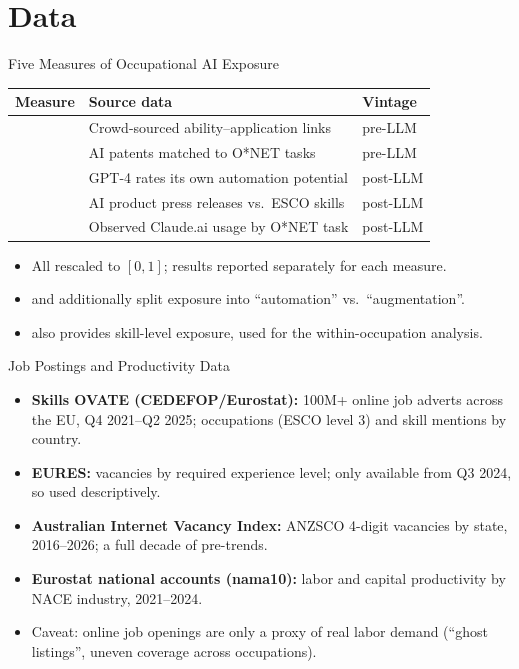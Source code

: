 \documentclass{beamer}
\begin{document}
\section{Data}
\begin{frame}{Five Measures of Occupational AI Exposure}
\footnotesize
\begin{table}
\begin{tabular}{lll}
\toprule
Measure & Source data & Vintage \\
\midrule
\citet{felten_method_2018} & Crowd-sourced ability--application links & pre-LLM \\
\citet{webb_impact_2022} & AI patents matched to O*NET tasks & pre-LLM \\
\citet{eloundou_gpts_2023} & GPT-4 rates its own automation potential & post-LLM \\
\citet{demirev2024assessing} & AI product press releases vs.\ ESCO skills & post-LLM \\
\citet{handa2025economic} & Observed Claude.ai usage by O*NET task & post-LLM \\
\bottomrule
\end{tabular}
\end{table}
\normalsize
\begin{itemize}
    \item All rescaled to $[0,1]$; results reported separately for each measure.
    \item \citet{demirev2024assessing} and \citet{handa2025economic} additionally split exposure into ``automation'' vs.\ ``augmentation''.
    \item \citet{demirev2024assessing} also provides skill-level exposure, used for the within-occupation analysis.
\end{itemize}
\end{frame}

\begin{frame}{Job Postings and Productivity Data}
\begin{itemize}
    \item \textbf{Skills OVATE (CEDEFOP/Eurostat):} 100M+ online job adverts across the EU, Q4 2021--Q2 2025; occupations (ESCO level 3) and skill mentions by country.
    \item \textbf{EURES:} vacancies by required experience level; only available from Q3 2024, so used descriptively.
    \item \textbf{Australian Internet Vacancy Index:} ANZSCO 4-digit vacancies by state, 2016--2026; a full decade of pre-trends.
    \item \textbf{Eurostat national accounts (nama10):} labor and capital productivity by NACE industry, 2021--2024.
    \item Caveat: online job openings are only a proxy of real labor demand (``ghost listings'', uneven coverage across occupations).
\end{itemize}
\end{frame}
\end{document}
